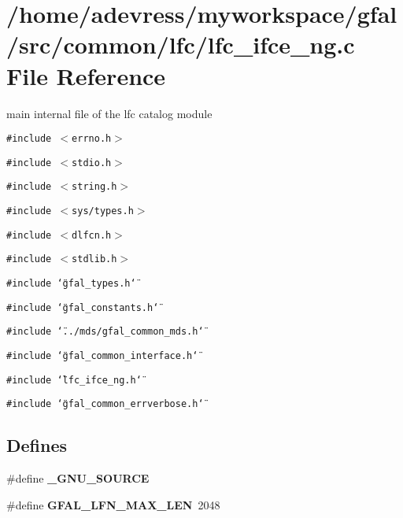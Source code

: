 \section{/home/adevress/myworkspace/gfal/src/common/lfc/lfc\_\-ifce\_\-ng.c File Reference}
\label{lfc__ifce__ng_8c}
main internal file of the lfc catalog module 

{\tt \#include $<$errno.h$>$}\par
{\tt \#include $<$stdio.h$>$}\par
{\tt \#include $<$string.h$>$}\par
{\tt \#include $<$sys/types.h$>$}\par
{\tt \#include $<$dlfcn.h$>$}\par
{\tt \#include $<$stdlib.h$>$}\par
{\tt \#include \char`\"{}gfal\_\-types.h\char`\"{}}\par
{\tt \#include \char`\"{}gfal\_\-constants.h\char`\"{}}\par
{\tt \#include \char`\"{}../mds/gfal\_\-common\_\-mds.h\char`\"{}}\par
{\tt \#include \char`\"{}gfal\_\-common\_\-interface.h\char`\"{}}\par
{\tt \#include \char`\"{}lfc\_\-ifce\_\-ng.h\char`\"{}}\par
{\tt \#include \char`\"{}gfal\_\-common\_\-errverbose.h\char`\"{}}\par
\subsection*{Defines}
\begin{CompactItemize}
\item 
\#define \textbf{\_\-GNU\_\-SOURCE}\label{lfc__ifce__ng_8c_53abf256730d533302d1910e5fb61efe}

\item 
\#define \textbf{GFAL\_\-LFN\_\-MAX\_\-LEN}~2048\label{lfc__ifce__ng_8c_74cbac9029a516b4ae28199debf71835}

\end{CompactItemize}
